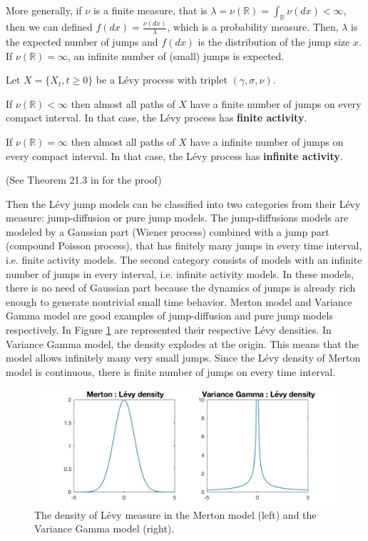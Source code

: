 More generally, if $\nu$ is a finite measure, that is $\lambda = \nu(\mathbb{R}) =\int_\mathbb{R}\nu(dx) <\infty$, 
then we can defined $f(dx) = \frac{\nu(dx)}{\lambda}$, which is a probability measure. Then, $\lambda$ is the expected number of jumps and $f(dx)$ is the distribution of the jump size $x$. If $\nu(\mathbb{R}) = \infty$, an infinite number of (small) jumps is expected.

\begin{prop}
Let $X =\{X_t,t\geq 0\}$ be a L\'evy process with triplet $(\gamma,\sigma,\nu)$.
\begin{my_list}
\item If $\nu(\mathbb{R})<\infty$ then almost all paths of $X$ have a finite number of jumps on every compact interval. In that case, the L\'evy process has \textbf{finite activity}.
\item If $\nu(\mathbb{R})=\infty$ then almost all paths of $X$ have a infinite number of jumps on every compact interval. In that case, the L\'evy process has \textbf{infinite activity}.
\end{my_list}
\end{prop}
(See Theorem 21.3 in \citeauthor{Sat99} \citeyearpar{Sat99} \cite{Sat99} for the proof)

Then the L\'evy jump models can be classified into two categories from their L\'evy measure: jump-diffusion or pure jump models. The jump-diffusions models are modeled by a Gaussian part (Wiener process) combined with a jump part (compound Poisson process), that has finitely many jumps in every time interval, i.e. finite activity models. The second category consists of models with an infinite number of jumps in every interval, i.e. infinite activity models. In these models, there is no need of Gaussian part because the dynamics of jumps is already rich enough to generate nontrivial small time behavior. Merton model and Variance Gamma model are good examples of jump-diffusion and pure jump models respectively. In Figure \ref{fig:Levy:densities} are represented their respective L\'evy densities. In Variance Gamma model, the density explodes at the origin. This means that the model allows infinitely many very small jumps. Since the L\'evy density of Merton model is continuous, there is finite number of jumps on every time interval.

\begin{figure}[!htb]
	\includegraphics[width=\textwidth]{gfx/Levy_densities}
	\caption{The density of L\'evy measure in the Merton model (left) and the Variance Gamma model (right).}
	\label{fig:Levy:densities}
\end{figure}

